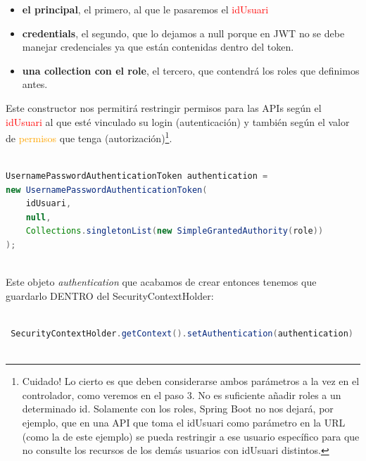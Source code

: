 \documentclass[a4paper,12pt]{report}
\begin{document}
		 	\begin{itemize}
		 	\setlength{\itemsep}{-.5em}

			  \item \textbf{el principal}, el primero, al que le pasaremos el \textcolor{red}{idUsuari}
			 \item  \textbf{credentials}, el segundo, que lo dejamos a null porque en JWT no se debe manejar credenciales ya que están contenidas dentro del token. 
			  \item \textbf{una collection con el role}, el tercero, que contendrá los roles que definimos antes. 
		  \end{itemize}
		  Este constructor nos permitirá restringir permisos para las APIs según el \textcolor{red}{idUsuari} al que esté vinculado su login (autenticación) y también según el valor de \textcolor{orange}{permisos} que tenga (autorización)\footnote{Cuidado! Lo cierto es que deben considerarse ambos parámetros a la vez en el controlador, como veremos en el paso 3. No es suficiente añadir roles a un determinado id. Solamente con los roles, Spring Boot no nos dejará, por ejemplo, que en una API que toma el idUsuari como parámetro en la URL (como la de este ejemplo) se pueda restringir a ese usuario específico para que no consulte los recursos de los demás usuarios con idUsuari distintos.}.
		  

		  
		  
 \begin{lstlisting}[language=Java, basicstyle=\ttfamily\footnotesize, keywordstyle=\color{magenta}]
	  	
UsernamePasswordAuthenticationToken authentication = 
new UsernamePasswordAuthenticationToken(
	idUsuari,
	null,
	Collections.singletonList(new SimpleGrantedAuthority(role))
);



 \end{lstlisting}
Este objeto \textit{authentication} que acabamos de crear entonces tenemos que guardarlo DENTRO del SecurityContextHolder:

		 
 \begin{lstlisting}[language=Java, basicstyle=\ttfamily\footnotesize, keywordstyle=\color{magenta}]

 SecurityContextHolder.getContext().setAuthentication(authentication)
	
\end{lstlisting}
	
	
	
\end{document}
